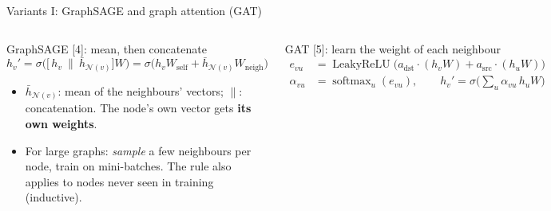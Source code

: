 \documentclass[aspectratio=169,10pt]{beamer}
\DeclareMathOperator{\softmax}{softmax}
\renewcommand{\cite}[1]{{\scriptsize\color{cTok}[#1]}}
\DeclareMathOperator{\LeakyReLU}{LeakyReLU}
\newcommand{\N}{\mathcal N}
\begin{document}
\begin{frame}{Variants I: GraphSAGE and graph attention (GAT)}
\begin{columns}[T,onlytextwidth]
\begin{block}{GraphSAGE \cite{4}: mean, then concatenate}
\vspace{-2.5mm}
\[
 h_v'=\sigma\bigl(\bigl[\,h_v\ \|\ \bar h_{\N(v)}\bigr]W\bigr)
     =\sigma\bigl(h_vW_{\text{self}}+\bar h_{\N(v)}W_{\text{neigh}}\bigr)
\]
\vspace{-4mm}

\footnotesize
\begin{itemize}
  \item $\bar h_{\N(v)}$: mean of the neighbours' vectors; $\|$: concatenation. The node's own vector
        gets \textbf{its own weights}.
  \item For large graphs: \emph{sample} a few neighbours per node, train on mini-batches. The rule
        also applies to nodes never seen in training (inductive).
\end{itemize}
\end{block}
\vspace{-0.5mm}
\begin{block}{GAT \cite{5}: learn the weight of each neighbour}
\vspace{-3mm}\footnotesize
\begin{align*}
 e_{vu}&=\LeakyReLU\bigl(a_{\text{dst}}\!\cdot\!(h_vW)+a_{\text{src}}\!\cdot\!(h_uW)\bigr)\\[-2pt]
 \alpha_{vu}&=\softmax_{u}(e_{vu}),\qquad h_v'=\sigma\bigl(\textstyle\sum_{u}\alpha_{vu}\,h_uW\bigr)
\end{align*}
\vspace{-4.5mm}


\end{block}
\end{columns}
\end{frame}
\end{document}
